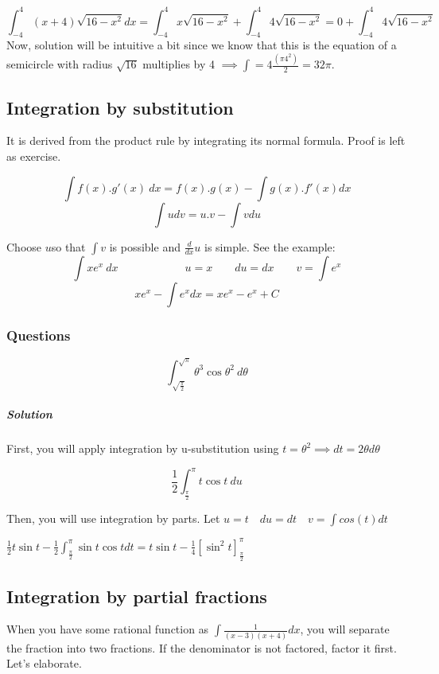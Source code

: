 \documentclass{article}
\begin{document}
\begin{enumerate}[1.]
			\[ \int^4_{-4} (x+4) \sqrt{ 16-x^2 } dx 
			= \int^4_{-4} x  \sqrt{ 16-x^2 } + \int^4_{-4} 4  \sqrt{ 16-x^2 } = 0 + \int^4_{-4} 4  \sqrt{ 16-x^2 }
			\]
			Now, solution will be intuitive a bit since we know that this is the equation of a semicircle with radius $ \sqrt{16} $ multiplies by 4 $ \implies \int = 4 \frac{ (\pi 4^2) } {2} = 32\pi  $.
			\subsection{Integration by substitution}

			It is derived from the product rule by integrating its normal formula. Proof is left as exercise.

			\[
				\int f(x). g'(x)\ dx=f(x).g(x)-\int g(x).f'(x) dx
			\]
			\[
				\int u dv = u.v - \int v du 
			\]

			Choose $ u $so that $ \int{v}$ is possible and $ \frac{d}{dx} u $ is simple. See the example:
			\[
				\int x e^x\ dx \qquad \qquad \qquad u = x \qquad du = dx \qquad  v = \int e^x
			\]
			\[
				xe^x- \int e^x dx  = xe^x-e^x+C
			\]

			\subsubsection{Questions}

			\[
				\int^{\sqrt{\pi}}_{\sqrt{\frac{\pi}{2}}} \theta^3 \cos{ \theta^2 }\ d \theta  
			\]
			\subparagraph{Solution}
			First, you will apply integration by u-substitution using $ t = \theta^2 \implies dt = 2\theta d \theta$  

			\[
				\frac{1}{2}	\int^{\pi}_{\frac{\pi}{2}} t \cos{ t }\ du 
			\]

			Then, you will use integration by parts. Let $ u = t \quad du = dt \quad v = \int cos(t)dt$

			$ \frac{1}{2} t \sin{ t } - \frac{1}{2} \int^{\pi}_{\frac{\pi}{2}} \sin{ t } \cos{ t } dt = t \sin t - \frac{1}{4} [\sin^2{ t }]^{\pi}_{\frac{\pi}{2}} $


	\end{enumerate}

	\subsection{Integration by partial fractions}

	When you have some rational function as $ \int \frac{1}{(x-3)(x+4)} dx $, you will separate the fraction into two fractions. If the denominator is not factored, factor it first. Let's elaborate.
\end{document}
